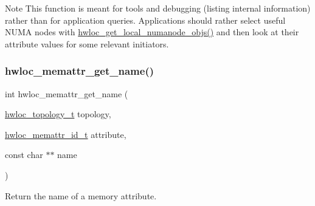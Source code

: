 \begin{DoxyNote}{Note}
This function is meant for tools and debugging (listing internal information) rather than for application queries. Applications should rather select useful N\+U\+MA nodes with \hyperlink{a00211_ga569e80c5be7ef27649b0ef5aa52ffcdc}{hwloc\+\_\+get\+\_\+local\+\_\+numanode\+\_\+objs()} and then look at their attribute values for some relevant initiators. 
\end{DoxyNote}
\mbox{\label{a00212_ga5300e9be1abdea2e00c18492148aecd0}} 
\subsubsection{\texorpdfstring{hwloc\+\_\+memattr\+\_\+get\+\_\+name()}{hwloc\_memattr\_get\_name()}}
{\footnotesize\ttfamily int hwloc\+\_\+memattr\+\_\+get\+\_\+name (\begin{DoxyParamCaption}\item[{\hyperlink{a00186_ga9d1e76ee15a7dee158b786c30b6a6e38}{hwloc\+\_\+topology\+\_\+t}}]{topology,  }\item[{\hyperlink{a00211_gacc82003a8610be554615995f0996c888}{hwloc\+\_\+memattr\+\_\+id\+\_\+t}}]{attribute,  }\item[{const char $\ast$$\ast$}]{name }\end{DoxyParamCaption})}



Return the name of a memory attribute. 

\mbox{\label{a00212_ga3177cc0ab47e4dd1fa69ca1df4c7cb1a}} 

